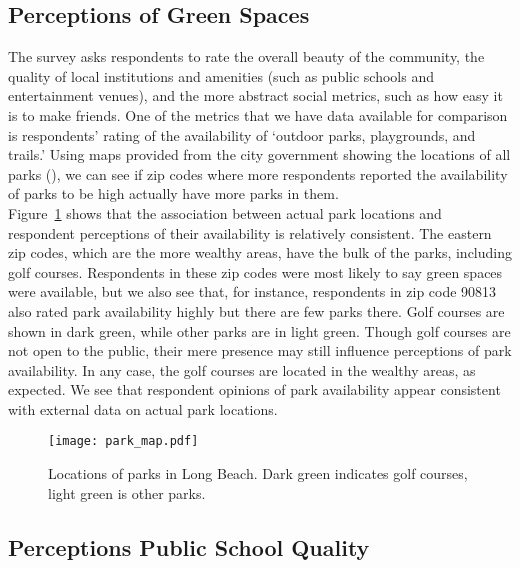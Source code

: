 \subsection{Perceptions of Green Spaces}

The survey asks respondents to rate the overall beauty of the community, the quality of local institutions and amenities (such as public schools and entertainment venues), and the more abstract social metrics, such as how easy it is to make friends.  One of the metrics that we have data available for comparison is respondents' rating of the availability of `outdoor parks, playgrounds, and trails.'  Using maps provided from the city government showing the locations of all parks (\citealt{LBData}), we can see if zip codes where more respondents reported the availability of parks to be high actually have more parks in them.\\  
\indent
Figure~\ref{fig:parks} shows that the association between actual park locations and respondent perceptions of their availability is relatively consistent.  The eastern zip codes, which are the more wealthy areas, have the bulk of the parks, including golf courses.  Respondents in these zip codes were most likely to say green spaces were available, but we also see that, for instance, respondents in zip code 90813 also rated park availability highly but there are few parks there.  Golf courses are shown in dark green, while other parks are in light green.  Though golf courses are not open to the public, their mere presence may still influence perceptions of park availability.  In any case, the golf courses are located in the wealthy areas, as expected.  We see that respondent opinions of park availability appear consistent with external data on actual park locations.

\begin{figure}
  \centering
  \texttt{[image: park\_map.pdf]}
\caption{Locations of parks in Long Beach. Dark green indicates golf courses, light green is other parks.}
\label{fig:parks}       
\end{figure}

\subsection{Perceptions Public School Quality}

